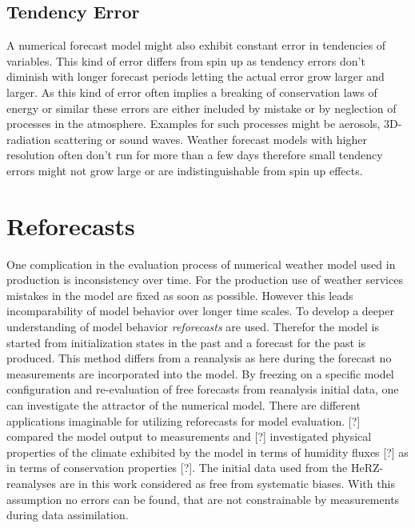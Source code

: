 \subsection{Tendency Error}
\p
A numerical forecast model might also exhibit constant error in tendencies of variables. This kind of error differs from spin up as tendency errors don't diminish with longer forecast periods letting the actual error grow larger and larger.
\p
As this kind of error often implies a breaking of conservation laws of energy or similar these errors are either included by mistake or by neglection of processes in the atmosphere. Examples for such processes might be aerosols, 3D-radiation scattering or sound waves.
\p
Weather forecast models with higher resolution often don't run for more than a few days therefore small tendency errors might not grow large or are indistinguishable from spin up effects.
\section{Reforecasts}
\p
One complication in the evaluation process of numerical weather model used in production is inconsistency over time. For the production use of weather services mistakes in the model are fixed as soon as possible. However this leads incomparability of model behavior over longer time scales.
\p
To develop a deeper understanding of model behavior \emph{reforecasts} are used. Therefor the model is started from initialization states in the past and a forecast for the past is produced. This method differs from a reanalysis as here during the forecast no measurements are incorporated into the model.
\p
By freezing on a specific model configuration and re-evaluation of free forecasts from reanalysis initial data, one can investigate the attractor of the numerical model.
\p
There are different applications imaginable for utilizing reforecasts for model evaluation. [?] compared the model output to measurements and [?] investigated physical properties of the climate exhibited by the model in terms of humidity fluxes [?] as in terms of conservation properties [?].
\p
The initial data used from the HeRZ-reanalyses are in this work considered as free from systematic biases. With this assumption no errors can be found, that are not constrainable by measurements during data assimilation. 
